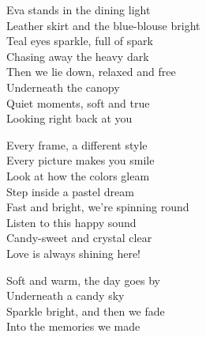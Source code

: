 \begin{lyrics}
Eva stands in the dining light\\
Leather skirt and the blue-blouse bright\\
Teal eyes sparkle, full of spark\\
Chasing away the heavy dark\\
Then we lie down, relaxed and free\\
Underneath the canopy\\
Quiet moments, soft and true\\
Looking right back at you

Every frame, a different style\\
Every picture makes you smile\\
Look at how the colors gleam\\
Step inside a pastel dream\\
Fast and bright, we're spinning round\\
Listen to this happy sound\\
Candy-sweet and crystal clear\\
Love is always shining here!

Soft and warm, the day goes by\\
Underneath a candy sky\\
Sparkle bright, and then we fade\\
Into the memories we made
\end{lyrics}

